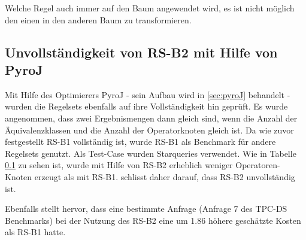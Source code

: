 Welche Regel auch immer auf den Baum angewendet wird, es ist nicht möglich den einen in den anderen Baum zu transformieren.

\subsection{Unvollständigkeit von RS-B2 mit Hilfe von PyroJ}

Mit Hilfe des Optimierers PyroJ - sein Aufbau wird in \ref{sec:pyroJ} behandelt - wurden die Regelsets ebenfalls auf ihre Vollständigkeit hin geprüft. Es wurde angenommen, dass zwei Ergebnismengen dann gleich sind, wenn die Anzahl der Äquivalenzklassen und die Anzahl der Operatorknoten gleich ist. Da wie zuvor festgestellt RS-B1 vollständig ist, wurde RS-B1 als Benchmark für andere Regelsets genutzt. Als Test-Case wurden Starqueries verwendet. Wie in Tabelle \ref{} zu sehen ist, wurde mit Hilfe von RS-B2 erheblich weniger Operatoren-Knoten erzeugt als mit RS-B1. \cite{} schlisst daher darauf, dass RS-B2 unvollständig ist.

Ebenfalls stellt \cite{} hervor, dass eine bestimmte Anfrage (Anfrage 7 des TPC-DS Benchmarks) bei der Nutzung des RS-B2 eine um 1.86 höhere geschätzte Kosten als RS-B1 hatte.

